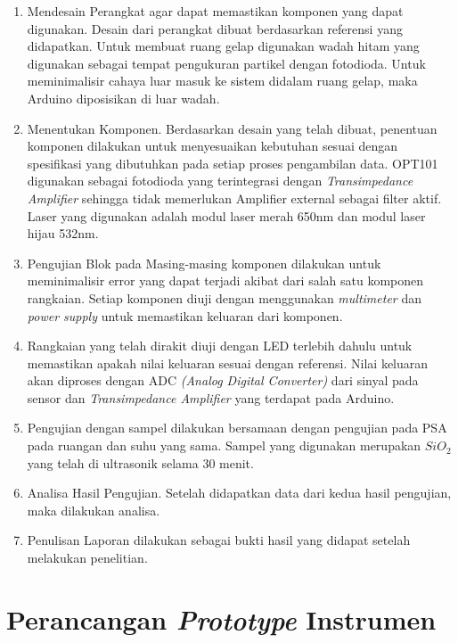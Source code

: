 \begin{enumerate}
    \item Mendesain Perangkat agar dapat memastikan komponen yang dapat digunakan. Desain dari
    perangkat dibuat berdasarkan referensi yang didapatkan. Untuk membuat ruang gelap digunakan
    wadah hitam yang digunakan sebagai tempat pengukuran partikel dengan fotodioda. Untuk
    meminimalisir cahaya luar masuk ke sistem didalam ruang gelap, maka Arduino diposisikan
    di luar wadah.
    \item Menentukan Komponen. Berdasarkan desain yang telah dibuat, penentuan komponen dilakukan
    untuk menyesuaikan kebutuhan sesuai dengan spesifikasi yang dibutuhkan pada setiap proses
    pengambilan data. OPT101 digunakan sebagai fotodioda yang terintegrasi dengan
    \textit{Transimpedance Amplifier} sehingga tidak memerlukan Amplifier external sebagai filter
    aktif. Laser yang digunakan adalah modul laser merah 650nm dan modul laser hijau 532nm.
    \item Pengujian Blok pada Masing-masing komponen dilakukan untuk meminimalisir error yang
    dapat terjadi akibat dari salah satu komponen rangkaian. Setiap komponen diuji dengan
    menggunakan \textit{multimeter} dan \textit{power supply} untuk memastikan keluaran dari
    komponen.
    \item Rangkaian yang telah dirakit diuji dengan LED terlebih dahulu untuk memastikan
    apakah nilai keluaran sesuai dengan referensi. Nilai keluaran akan diproses dengan ADC
    \textit{(Analog Digital Converter)} dari sinyal pada sensor dan \textit{Transimpedance Amplifier}
    yang terdapat pada Arduino.
    \item Pengujian dengan sampel dilakukan bersamaan dengan pengujian pada PSA pada ruangan
    dan suhu yang sama. Sampel yang digunakan merupakan ${SiO_2}$ yang telah di ultrasonik
    selama 30 menit.
    \item Analisa Hasil Pengujian. Setelah didapatkan data dari kedua hasil pengujian, maka dilakukan
    analisa.
    \item Penulisan Laporan dilakukan sebagai bukti hasil yang didapat setelah melakukan penelitian.

\end{enumerate}


\section{Perancangan \textit{Prototype} Instrumen}

